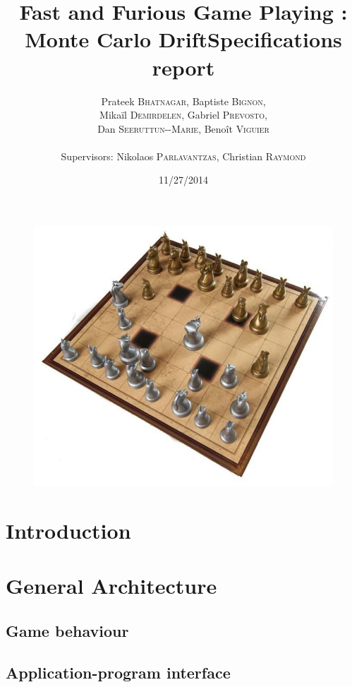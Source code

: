 \documentclass[12pt]{article}
\title{Fast and Furious Game Playing : Monte Carlo Drift\smallbreak Specifications report} %
\author{Prateek \textsc{Bhatnagar}, Baptiste \textsc{Bignon}, \\
        Mikaïl \textsc{Demirdelen}, Gabriel \textsc{Prevosto}, \\
        Dan \textsc{Seeruttun-{}-Marie}, Benoît \textsc{Viguier} \\
        \\
        Supervisors: Nikolaos \textsc{Parlavantzas}, Christian \textsc{Raymond}}
\date{11/27/2014}
\begin{document}
\maketitle

\begin{figure}[!h] 
\centerline{\includegraphics[scale=0.50]{Pictures/arimaa}}
\end{figure}
\newpage


\begin{abstract}
\end{abstract}
\newpage

\tableofcontents
\newpage


\section{Introduction}					\label{sec:introduction} 
\newpage

\section{General Architecture}				\label{sec:generalArchitecture}
	\subsection{Game behaviour}			\label{sec:gameBehavioiur}	
	\subsection{Application-program interface}	\label{sec:api}
\newpage
\end{document}
